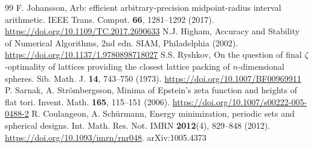 \documentclass[10pt,twocolumn,a4paper]{article}
\theoremstyle{definition}
\begin{document}
\begin{thebibliography}{99}
 F. Johansson, Arb: efficient arbitrary-precision midpoint-radius interval arithmetic. IEEE Trans. Comput. \textbf{66}, 1281--1292 (2017). \url{https://doi.org/10.1109/TC.2017.2690633}
 N.J. Higham, Accuracy and Stability of Numerical Algorithms, 2nd edn. SIAM, Philadelphia (2002). \url{https://doi.org/10.1137/1.9780898718027}
 S.S. Ryshkov, On the question of final $\zeta$-optimality of lattices providing the closest lattice packing of $n$-dimensional spheres. Sib. Math. J. \textbf{14}, 743--750 (1973). \url{https://doi.org/10.1007/BF00969911}
 P. Sarnak, A. Str\"ombergsson, Minima of Epstein's zeta function and heights of flat tori. Invent. Math. \textbf{165}, 115--151 (2006). \url{https://doi.org/10.1007/s00222-005-0488-2}
 R. Coulangeon, A. Sch\"urmann, Energy minimization, periodic sets and spherical designs. Int. Math. Res. Not. IMRN \textbf{2012}(4), 829--848 (2012). \url{https://doi.org/10.1093/imrn/rnr048}. arXiv:1005.4373
\end{thebibliography}
\end{document}
